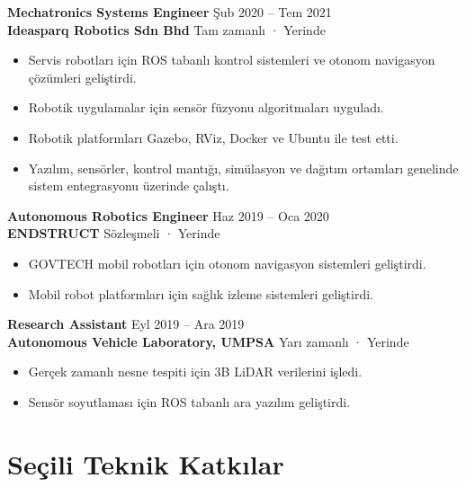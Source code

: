 \documentclass[11pt,a4paper]{article}
\begin{document}
\textbf{\color{PrimaryColor}Mechatronics Systems Engineer} \hfill Şub 2020 -- Tem 2021\\
\textbf{Ideasparq Robotics Sdn Bhd} \hfill Tam zamanlı · Yerinde

\begin{itemize}
    \item Servis robotları için ROS tabanlı kontrol sistemleri ve otonom navigasyon çözümleri geliştirdi.
    \item Robotik uygulamalar için sensör füzyonu algoritmaları uyguladı.
    \item Robotik platformları Gazebo, RViz, Docker ve Ubuntu ile test etti.
    \item Yazılım, sensörler, kontrol mantığı, simülasyon ve dağıtım ortamları genelinde sistem entegrasyonu üzerinde çalıştı.
\end{itemize}

\textbf{\color{PrimaryColor}Autonomous Robotics Engineer} \hfill Haz 2019 -- Oca 2020\\
\textbf{ENDSTRUCT} \hfill Sözleşmeli · Yerinde

\begin{itemize}
    \item GOVTECH mobil robotları için otonom navigasyon sistemleri geliştirdi.
    \item Mobil robot platformları için sağlık izleme sistemleri geliştirdi.
\end{itemize}

\textbf{\color{PrimaryColor}Research Assistant} \hfill Eyl 2019 -- Ara 2019\\
\textbf{Autonomous Vehicle Laboratory, UMPSA} \hfill Yarı zamanlı · Yerinde

\begin{itemize}
    \item Gerçek zamanlı nesne tespiti için 3B LiDAR verilerini işledi.
    \item Sensör soyutlaması için ROS tabanlı ara yazılım geliştirdi.
\end{itemize}

\section*{Seçili Teknik Katkılar}
\end{document}
